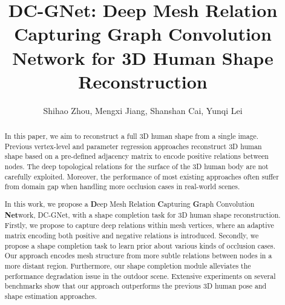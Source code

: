 \documentclass[sigplan]{acmart}
\begin{document}
\fancyhead{}
\title{DC-GNet: Deep Mesh Relation Capturing Graph Convolution Network for 3D Human Shape Reconstruction}

\author{Shihao Zhou, Mengxi Jiang, Shanshan Cai, Yunqi Lei}






\renewcommand{\shortauthors}{Trovato and Tobin, et al.}

\begin{abstract}
In this paper, we aim to reconstruct a full 3D human shape from a single image. Previous vertex-level and parameter regression approaches reconstruct 3D human shape based on a pre-defined adjacency matrix to encode positive relations between nodes. The deep topological relations for the surface of the 3D human body are not carefully exploited. Moreover, the performance of most existing approaches often suffer from domain gap when handling more occlusion cases in real-world scenes.

In this work, we propose a \textbf{D}eep Mesh Relation \textbf{C}apturing \textbf{G}raph Convolution \textbf{Net}work, DC-GNet, with a shape completion task for 3D human shape reconstruction. Firstly, we propose to capture deep relations within mesh vertices, where an adaptive matrix encoding both positive and negative relations is introduced. Secondly, we propose a shape completion task to learn prior about various kinds of occlusion cases. Our approach encodes mesh structure from more subtle relations between nodes in a more distant region. Furthermore, our shape completion module alleviates the performance degradation issue in the outdoor scene. Extensive experiments on several benchmarks show that our approach outperforms the previous 3D human pose and shape estimation approaches.
\end{abstract}









\maketitle
\end{document}

